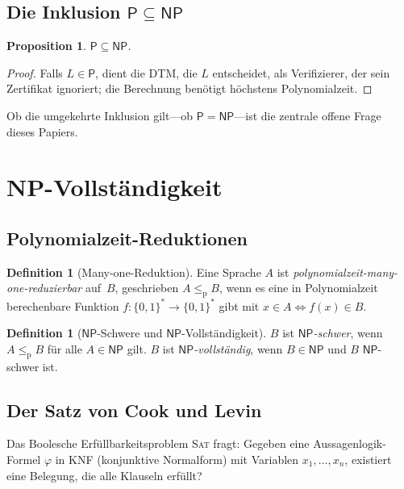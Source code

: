 \documentclass[12pt,a4paper]{amsart}
\newtheorem{proposition}[theorem]{Proposition}
\theoremstyle{definition}
\newtheorem{definition}[theorem]{Definition}
\newcommand{\Pclass}{\mathsf{P}}
\newcommand{\NP}{\mathsf{NP}}
\newcommand{\SAT}{\textsc{Sat}}
\newcommand{\polyredu}{\leq_{\mathrm{p}}}
\begin{document}
\subsection{Die Inklusion $\Pclass\subseteq\NP$}

\begin{proposition}
$\Pclass\subseteq\NP$.
\end{proposition}
\begin{proof}
Falls $L\in\Pclass$, dient die DTM, die $L$ entscheidet, als Verifizierer,
der sein Zertifikat ignoriert; die Berechnung benötigt höchstens Polynomialzeit.
\end{proof}

Ob die umgekehrte Inklusion gilt---ob $\Pclass = \NP$---ist die zentrale offene
Frage dieses Papiers.

\section{NP-Vollständigkeit}
\label{sec:npv}

\subsection{Polynomialzeit-Reduktionen}

\begin{definition}[Many-one-Reduktion]
Eine Sprache $A$ ist \emph{polynomialzeit-many-one-reduzierbar} auf~$B$,
geschrieben $A\polyredu B$, wenn es eine in Polynomialzeit berechenbare
Funktion $f\colon\{0,1\}^*\to\{0,1\}^*$ gibt mit $x\in A\iff f(x)\in B$.
\end{definition}

\begin{definition}[$\NP$-Schwere und $\NP$-Vollständigkeit]
$B$ ist \emph{$\NP$-schwer}, wenn $A\polyredu B$ für alle $A\in\NP$ gilt.
$B$ ist \emph{$\NP$-vollständig}, wenn $B\in\NP$ und $B$ $\NP$-schwer ist.
\end{definition}

\subsection{Der Satz von Cook und Levin}

Das Boolesche Erfüllbarkeitsproblem \SAT{} fragt: Gegeben eine
Aussagenlogik-Formel $\varphi$ in KNF (konjunktive Normalform) mit Variablen
$x_1,\ldots,x_n$, existiert eine Belegung, die alle Klauseln erfüllt?
\end{document}

